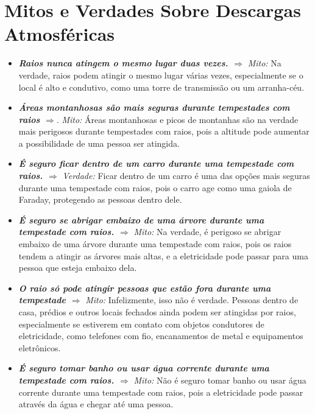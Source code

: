 \documentclass[a4paper, 12pt, onecolumn,singlespacing]{article}
\begin{document}
	\section{Mitos e Verdades Sobre Descargas Atmosféricas}
	
	\begin{itemize}
		\item \textbf{\textit{ Raios nunca atingem o mesmo lugar duas vezes. $\Rightarrow$}}
		\textit{Mito:} Na verdade, raios podem atingir o mesmo lugar várias vezes, especialmente se o local é alto e condutivo, como uma torre de transmissão ou um arranha-céu.
		
		\item 	\textbf{\textit{Áreas montanhosas são mais seguras durante tempestades com raios $\Rightarrow$}}.
		\textit{Mito:}  Áreas montanhosas e picos de montanhas são na verdade mais perigosos durante tempestades com raios, pois a altitude pode aumentar a possibilidade de uma pessoa ser atingida.
		
		\item \textbf{\textit{É seguro ficar dentro de um carro durante uma tempestade com raios. $\Rightarrow$}}
		\textit{Verdade:} Ficar dentro de um carro é uma das opções mais seguras durante uma tempestade com raios, pois o carro age como uma gaiola de Faraday, protegendo as pessoas dentro dele.
		
		\item \textbf{\textit{É seguro se abrigar embaixo de uma árvore durante uma tempestade com raios. $\Rightarrow$}}
		\textit{Mito:} Na verdade, é perigoso se abrigar embaixo de uma árvore durante uma tempestade com raios, pois os raios tendem a atingir as árvores mais altas, e a eletricidade pode passar para uma pessoa que esteja embaixo dela.
		
		\item \textbf{\textit{O raio só pode atingir pessoas que estão fora durante uma tempestade $\Rightarrow$}} \textit{Mito:} Infelizmente, isso não é verdade. Pessoas dentro de casa, prédios e outros locais fechados ainda podem ser atingidas por raios, especialmente se estiverem em contato com objetos condutores de eletricidade, como telefones com fio, encanamentos de metal e equipamentos eletrônicos.
		
		\item \textbf{\textit{É seguro tomar banho ou usar água corrente durante uma tempestade com raios. $\Rightarrow$}}
		\textit{Mito: } Não é seguro tomar banho ou usar água corrente durante uma tempestade com raios, pois a eletricidade pode passar através da água e chegar até uma pessoa.
		

\end{itemize}
\end{document}
